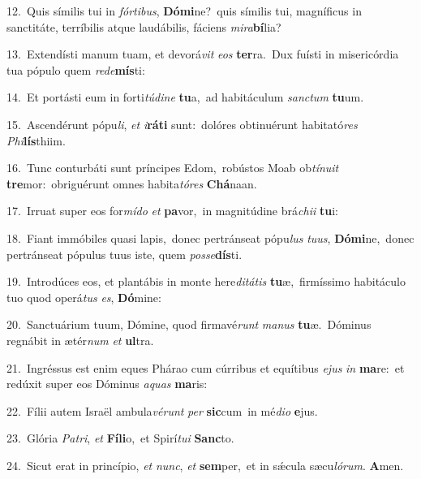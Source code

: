 {\numbfont\textcolor{\numbcolor}{12.}}~Quis símilis tui in \textit{fór}\-\textit{ti}\textit{bus}, \textbf{Dó}\-\textbf{mi}ne?~\star quis símilis tui, magníficus in sanctitáte, terríbilis atque laudábilis, fáciens \textit{mi}\-\textit{ra}\textbf{bí}lia?\par
{\numbfont\textcolor{\numbcolor}{13.}}~Extendísti manum tuam, et devorá\textit{vit} \textit{e}\-\textit{os} \textbf{ter}\-ra.~\star Dux fuísti in misericórdia tua pópulo quem \textit{red}\-\textit{e}\textbf{mís}ti:\par
{\numbfont\textcolor{\numbcolor}{14.}}~Et portásti eum in forti\-\textit{tú}\-\textit{di}\textit{ne} \textbf{tu}\-a,~\star ad habitáculum \textit{sanc}\-\textit{tum} \textbf{tu}\-um.\par
{\numbfont\textcolor{\numbcolor}{15.}}~Ascendérunt pópu\-\textit{li}\-, \textit{et} \textit{i}\-\textbf{rá}\textbf{ti} sunt:~\star dolóres obtinuérunt habitató\textit{res} \textit{Phi}\-\textbf{lís}thiim.\par
{\numbfont\textcolor{\numbcolor}{16.}}~Tunc conturbáti sunt príncipes Edom,~\dagger robústos Moab ob\-\textit{tí}\-\textit{nu}\textit{it} \textbf{tre}\-mor:~\star obriguérunt omnes habita\-\textit{tó}\-\textit{res} \textbf{Chá}\-naan.\par
{\numbfont\textcolor{\numbcolor}{17.}}~Irruat super eos for\-\textit{mí}\-\textit{do} \textit{et} \textbf{pa}\-vor,~\star in magnitúdine brá\-\textit{chi}\-\textit{i} \textbf{tu}\-i:\par
{\numbfont\textcolor{\numbcolor}{18.}}~Fiant immóbiles quasi lapis,~\dagger donec pertránseat pópu\textit{lus} \textit{tu}\-\textit{us}, \textbf{Dó}\-\textbf{mi}ne,~\star donec pertránseat pópulus tuus iste, quem \textit{pos}\-\textit{se}\textbf{dís}ti.\par
{\numbfont\textcolor{\numbcolor}{19.}}~Introdúces eos, et plantábis in monte here\-\textit{di}\-\textit{tá}\textit{tis} \textbf{tu}\-æ,~\star firmíssimo habitáculo tuo quod operá\textit{tus} \textit{es}\-, \textbf{Dó}\-mine:\par
{\numbfont\textcolor{\numbcolor}{20.}}~Sanctuárium tuum, Dómine, quod firmavé\textit{runt} \textit{ma}\-\textit{nus} \textbf{tu}\-æ.~\star Dóminus regnábit in ætér\textit{num} \textit{et} \textbf{ul}\-tra.\par
{\numbfont\textcolor{\numbcolor}{21.}}~Ingréssus est enim eques Phárao cum cúrribus et equítibus \textit{e}\-\textit{jus} \textit{in} \textbf{ma}\-re:~\star et redúxit super eos Dóminus \textit{a}\-\textit{quas} \textbf{ma}\-ris:\par
{\numbfont\textcolor{\numbcolor}{22.}}~Fílii autem Israël ambula\-\textit{vé}\-\textit{runt} \textit{per} \textbf{sic}\-cum~\star in mé\-\textit{di}\-\textit{o} \textbf{e}\-jus.\par
{\numbfont\textcolor{\numbcolor}{23.}}~Glória \textit{Pa}\-\textit{tri}, \textit{et} \textbf{Fí}\-\textbf{li}o,~\star et Spirí\-\textit{tu}\-\textit{i} \textbf{Sanc}\-to.\par
{\numbfont\textcolor{\numbcolor}{24.}}~Sicut erat in princípio, \textit{et} \textit{nunc}\-, \textit{et} \textbf{sem}\-per,~\star et in sǽcula sæcu\-\textit{ló}\-\textit{rum}. \textbf{A}\-men.\par
